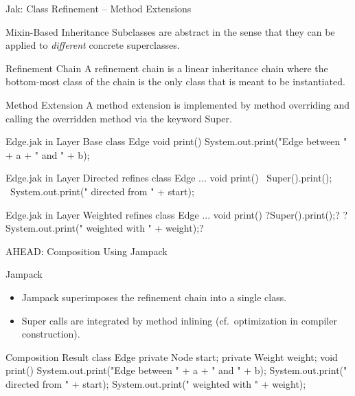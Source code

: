 \begin{frame}[fragile]{Jak: Class Refinement -- Method Extensions}
	\begin{fancycolumns}[animation=none]
		\begin{definition}{Mixin-Based Inheritance}
			Subclasses are abstract in the sense that they can be applied to \emph{different} concrete superclasses.
		\end{definition}
		\begin{definition}{Refinement Chain}
			A refinement chain is a linear inheritance chain where the bottom-most class of the chain is the only class that is meant to be instantiated.
		\end{definition}
		\begin{definition}{Method Extension}
			A method extension is implemented by method overriding and calling the overridden method via the keyword Super.
		\end{definition}
	\nextcolumn
	\footnotesize
\begin{codetight}[basicstyle=\tiny]{Edge.jak in Layer Base}
class Edge {
	void print() {
		System.out.print("Edge between " + a + " and " + b);
	}
}
\end{codetight}
\begin{codetight}[basicstyle=\tiny]{Edge.jak in Layer Directed}
refines class Edge {
	...
	void print() {
		~Super().print();~
		~System.out.print(" directed from " + start);~
	}
}
\end{codetight}
\begin{codetight}[basicstyle=\tiny]{Edge.jak in Layer Weighted}
refines class Edge {
	...
	void print() {
		?Super().print();?
		?System.out.print(" weighted with " + weight);?
	}
}
\end{codetight}
	\end{fancycolumns}
\end{frame}

\begin{frame}[fragile]{AHEAD: Composition Using Jampack}
	\begin{fancycolumns}[widths={35,65},animation=none]
		\begin{definition}{Jampack}
			\begin{itemize}
				\item Jampack superimposes the refinement chain into a single class.
				\item Super calls are integrated by method inlining (cf.\ optimization in compiler construction).
			\end{itemize}
		\end{definition}
	\nextcolumn
\begin{codetight}{Composition Result}
class Edge {
	private Node start;
	private Weight weight;
	void print() {
		System.out.print("Edge between " + a + " and " + b);
		System.out.print(" directed from " + start);
		System.out.print(" weighted with " + weight);
	}
}
\end{codetight}
	\end{fancycolumns}
\end{frame}

